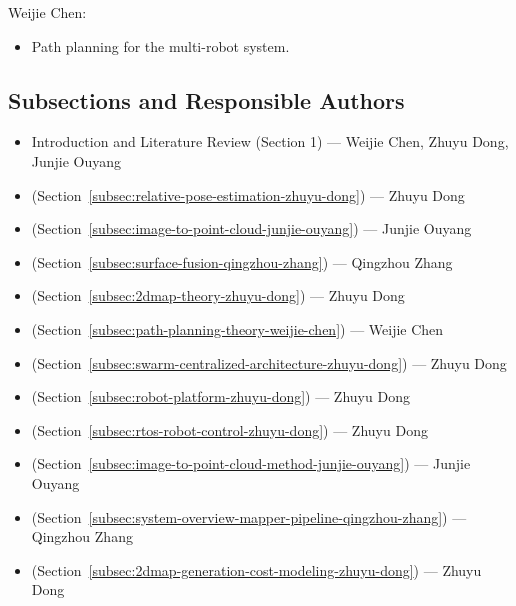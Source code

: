 \documentclass[12pt]{interim_report}
\begin{document}
Weijie Chen:
\begin{itemize}
    \item Path planning for the multi-robot system.
\end{itemize}


\subsection{Subsections and Responsible Authors}

\begin{itemize}
    \item Introduction and Literature Review (Section 1) --- Weijie Chen, Zhuyu Dong, Junjie Ouyang
    \item {} (Section~\ref{subsec:relative-pose-estimation-zhuyu-dong}) --- Zhuyu Dong
    \item {} (Section~\ref{subsec:image-to-point-cloud-junjie-ouyang}) --- Junjie Ouyang
    \item {} (Section~\ref{subsec:surface-fusion-qingzhou-zhang}) --- Qingzhou Zhang
    \item {} (Section~\ref{subsec:2dmap-theory-zhuyu-dong}) --- Zhuyu Dong
    \item {} (Section~\ref{subsec:path-planning-theory-weijie-chen}) --- Weijie Chen
    \item {} (Section~\ref{subsec:swarm-centralized-architecture-zhuyu-dong}) --- Zhuyu Dong
    \item {} (Section~\ref{subsec:robot-platform-zhuyu-dong}) --- Zhuyu Dong
    \item {} (Section~\ref{subsec:rtos-robot-control-zhuyu-dong}) --- Zhuyu Dong
    \item {} (Section~\ref{subsec:image-to-point-cloud-method-junjie-ouyang}) --- Junjie Ouyang
    \item {} (Section~\ref{subsec:system-overview-mapper-pipeline-qingzhou-zhang}) --- Qingzhou Zhang
    \item {} (Section~\ref{subsec:2dmap-generation-cost-modeling-zhuyu-dong}) --- Zhuyu Dong

\end{itemize}
\end{document}
